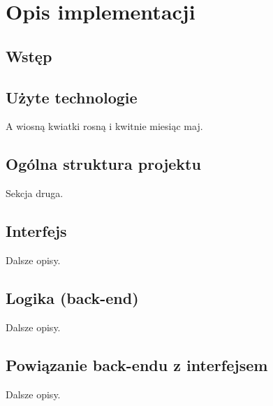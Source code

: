 \chapter{Opis implementacji}
\label{Chapter6}

\section{Wstęp}
\label{Chapter61}

%
\section{Użyte technologie}
\label{Chapter62}

A wiosną kwiatki rosną i kwitnie miesiąc maj.

\section{Ogólna struktura projektu}
\label{Chapter63}

Sekcja druga.

\section{Interfejs}
\label{Chapter64}

Dalsze opisy.

\section{Logika (back-end)}
\label{Chapter65}

Dalsze opisy.

\section{Powiązanie back-endu z interfejsem}
\label{Chapter66}

Dalsze opisy.